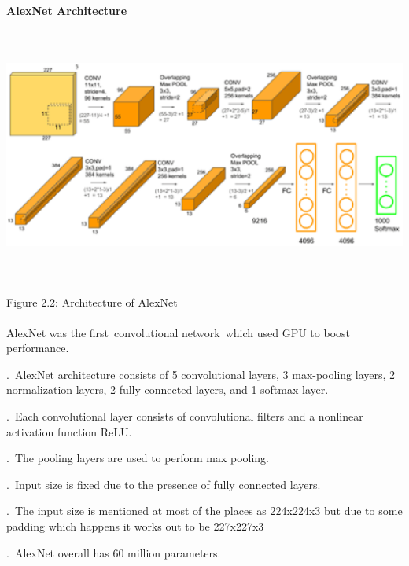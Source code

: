 \documentclass[10pt]{article} %
\begin{document}
\begin{spacing}{1.5}
\paragraph{}
\noindent \textbf{AlexNet Architecture}

\noindent \includegraphics*[width=5.90in, height=3.32in, keepaspectratio=false]{image6}

\noindent Figure 2.2: Architecture of AlexNet
\vspace{2mm}
\paragraph{}

\noindent AlexNet was the first~convolutional network~which used GPU to boost performance.~

.~AlexNet architecture consists of 5 convolutional layers, 3 max-pooling layers, 2 normalization layers, 2 fully connected layers, and 1 softmax layer.~

.~Each convolutional layer consists of convolutional filters and a nonlinear activation function ReLU.~

.~The pooling layers are used to perform max pooling.~

.~Input size is fixed due to the presence of fully connected layers.

.~The input size is mentioned at most of the places as 224x224x3 but due to some padding which happens it works out to be 227x227x3~

.~AlexNet overall has 60 million parameters.

\noindent 

\noindent 


\end{spacing}
\end{document}
